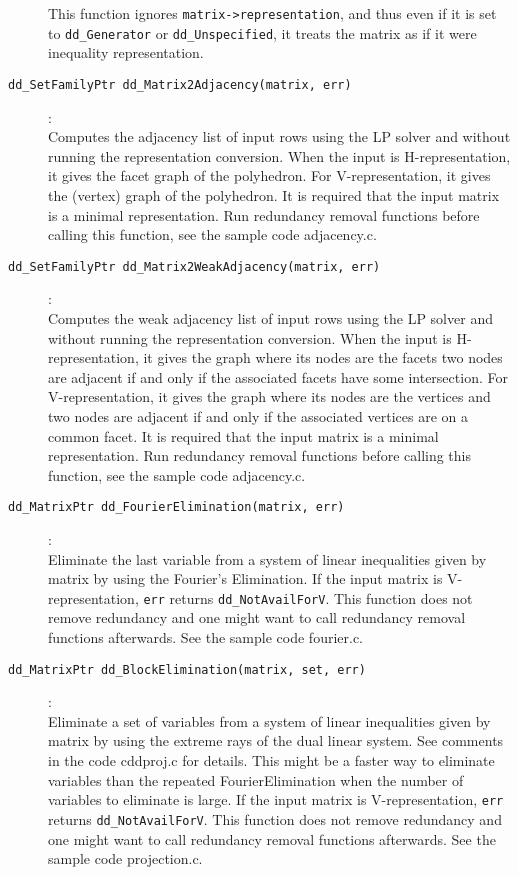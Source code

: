 \documentclass[11pt]{article}
\newcommand {\0} {{\bf 0}}
\begin{document}
\begin{description}
This function ignores {\tt matrix->representation}, and thus even if it is
set to {\tt dd\_Generator} or {\tt dd\_Unspecified}, it treats the matrix
as if it were inequality representation.

\item[{\tt dd\_SetFamilyPtr dd\_Matrix2Adjacency(matrix, err)}]:\\
Computes the adjacency list of input rows using
the LP solver and without running the representation conversion.  When
the input is H-representation, it gives the facet graph of the polyhedron.
For V-representation, it gives the (vertex) graph of the polyhedron.
It is required that the input matrix is a minimal representation.
Run redundancy removal functions before calling this function,
see the sample code adjacency.c.


\item[{\tt dd\_SetFamilyPtr dd\_Matrix2WeakAdjacency(matrix, err)}]:\\
Computes the weak adjacency list of input rows using
the LP solver and without running the representation conversion.  When
the input is H-representation, it gives the graph where its nodes are the facets
two nodes  are adjacent if and only if the associated facets have
some intersection.
For V-representation, it gives the graph where its nodes are the vertices
and two nodes are adjacent if and only if the associated vertices
are on a common facet.
It is required that the input matrix is a minimal representation.
Run redundancy removal functions before calling this function,
see the sample code adjacency.c.

\item[{\tt dd\_MatrixPtr dd\_FourierElimination(matrix, err)}]:\\
Eliminate the last variable from a system of linear inequalities
given by matrix by using the Fourier's Elimination.  If the
input matrix is V-representation, {\tt  *err} returns
{\tt dd\_NotAvailForV}.   This function does not
remove redundancy  and one might want to call
redundancy removal functions afterwards. See the sample code fourier.c.

\item[{\tt dd\_MatrixPtr dd\_BlockElimination(matrix, set, err)}]:\\
Eliminate a set of variables from a system of linear inequalities
given by matrix by using the extreme rays of the dual linear system.
See comments in the code cddproj.c for details.  This might be
a faster way to eliminate variables than the repeated FourierElimination when
the number of variables to eliminate is large.
If the input matrix is V-representation, {\tt  *err}  returns {\tt dd\_NotAvailForV}.
This function does not remove redundancy  and one might want to call
redundancy removal functions afterwards. See the sample code projection.c.



\end{description}
\end{document}
